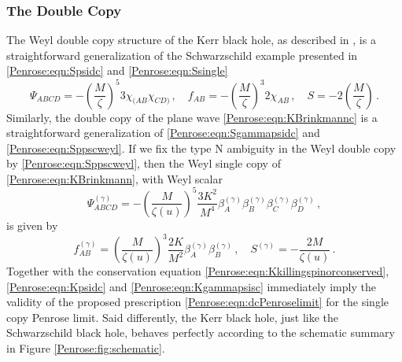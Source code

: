 
\subsubsection{The Double Copy}\label{Penrose:sec:KdcPenrose}

The Weyl double copy structure of the Kerr black hole, as described in \cite{Luna:2018dpt}, is a straightforward generalization of the Schwarzschild example presented in \eqref{Penrose:eqn:Spsidc} and \eqref{Penrose:eqn:Ssingle}
\begin{equation}\label{Penrose:eqn:Kpsidc}
\Psi_{ABCD} = -\left(\frac{M}{\zeta}\right)^5 3\chi_{(AB}\chi_{CD)} \, , \quad f_{AB} =   -\left(\frac{M}{\zeta}\right)^3 2\chi_{AB} \, , \quad S = - 2\left(\frac{M}{\zeta}\right) \, .
\end{equation}
Similarly, the double copy of the plane wave \eqref{Penrose:eqn:KBrinkmannc} is a straightforward generalization of
\eqref{Penrose:eqn:Sgammapsidc} and \eqref{Penrose:eqn:Sppscweyl}. If we fix the type N ambiguity in the Weyl double copy by \eqref{Penrose:eqn:Sppscweyl}, then the Weyl single copy of \eqref{Penrose:eqn:KBrinkmann}, with Weyl scalar
\begin{equation}\label{Penrose:eqn:Kgammapsidc}
	\Psi^{(\gamma)}_{ABCD} = -\left(\frac{M}{\zeta(u)}\right)^5 \frac{3 K^2}{M^4}  \beta^{(\gamma)}_A \beta^{(\gamma)}_B  \beta^{(\gamma)}_C  \beta^{(\gamma)}_D   \, ,
\end{equation}
 is given by
\begin{equation}\label{Penrose:eqn:Kgammapsisc}
 f^{(\gamma)}_{AB} =\left(\frac{M}{\zeta(u)}\right)^3 \frac{2K}{M^2} \beta^{(\gamma)}_A \beta^{(\gamma)}_B \, , \quad S^{(\gamma)} = -\frac{2M}{\zeta(u)}  \, .
\end{equation}
Together with the conservation equation \eqref{Penrose:eqn:Kkillingspinorconserved}, \eqref{Penrose:eqn:Kpsidc} and \eqref{Penrose:eqn:Kgammapsisc} immediately imply the validity of the proposed prescription \eqref{Penrose:eqn:dcPenroselimit} for the single copy Penrose limit. Said differently, the Kerr black hole, just like the Schwarzschild black hole, behaves perfectly according to the schematic summary in Figure \ref{Penrose:fig:schematic}.


